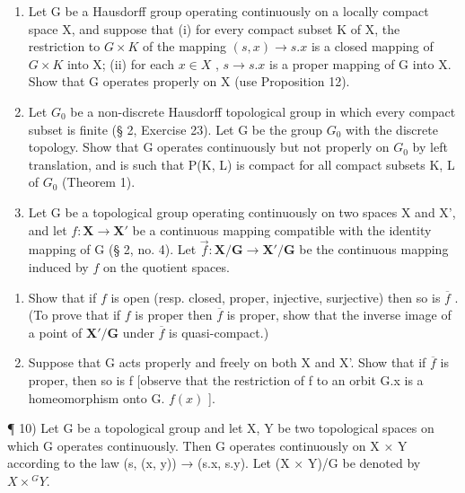 \begin{enumerate}
\def\labelenumi{\arabic{enumi})}
\setcounter{enumi}{6}
\item
  Let G be a Hausdorff group operating continuously on a locally compact space X, and suppose that (i) for every compact subset K of X, the restriction to \(G \times K\) of the mapping \((s, x) \to s.x\) is a closed mapping of \(G \times K\) into X; (ii) for each \(x \in X\) , \(s \to s.x\) is a proper mapping of G into X. Show that G operates properly on X (use Proposition 12).
\item
  Let \(G_{0}\) be a non-discrete Hausdorff topological group in which every compact subset is finite (§ 2, Exercise 23). Let G be the group \(G_{0}\) with the discrete topology. Show that G operates continuously but not properly on \(G_{0}\) by left translation, and is such that P(K, L) is compact for all compact subsets K, L of \(G_{0}\) (Theorem 1).
\item
  Let G be a topological group operating continuously on two spaces X and X', and let \(f: \mathbf{X} \to \mathbf{X}'\) be a continuous mapping compatible with the identity mapping of G (§ 2, no. 4). Let \(\vec{f}: \mathbf{X}/\mathbf{G} \to \mathbf{X}'/\mathbf{G}\) be the continuous mapping induced by \(f\) on the quotient spaces.
\end{enumerate}

\begin{enumerate}
\def\labelenumi{\alph{enumi})}
\item
  Show that if \(f\) is open (resp. closed, proper, injective, surjective) then so is \(\overline{f}\) . (To prove that if \(f\) is proper then \(\overline{f}\) is proper, show that the inverse image of a point of \(\mathbf{X}' / \mathbf{G}\) under \(\overline{f}\) is quasi-compact.)
\item
  Suppose that G acts properly and freely on both X and X'. Show that if \(\overline{f}\) is proper, then so is f {[}observe that the restriction of f to an orbit G.x is a homeomorphism onto G. \(f(x)\) {]}.
\end{enumerate}

¶ 10) Let G be a topological group and let X, Y be two topological spaces on which G operates continuously. Then G operates continuously on X × Y according to the law (s, (x, y)) → (s.x, s.y). Let (X × Y)/G be denoted by \(X \times {}^{G}Y\).

